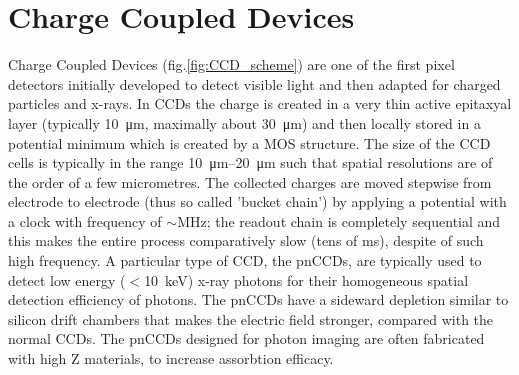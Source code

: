     
\section{Charge Coupled Devices}
   Charge Coupled Devices (fig.\ref{fig:CCD_scheme}) are one of the first pixel detectors initially developed to detect visible light and then adapted for charged particles and x-rays. 
   In CCDs the charge is created in a very thin active epitaxyal layer (typically \SI{10}{\um}, maximally about \SI{30}{\um}) and then locally stored in a potential minimum which is created by a MOS structure. 
   The size of the CCD cells is typically in the range \SIrange{10}{20}{\um} such that spatial resolutions are of the order of a few micrometres.
   The collected charges are moved stepwise from electrode to electrode (thus so called 'bucket chain') by applying a potential with a clock with frequency of $\sim$\si{MHz}; the readout chain is completely sequential and this makes the entire process comparatively slow (tens of \si{ms}), despite of such high frequency.
   A particular type of CCD, the pnCCDs, are typically used to detect low energy ($<$\SI{10}{keV}) x-ray photons for their homogeneous spatial detection efficiency of photons. The pnCCDs have a sideward depletion similar to silicon drift chambers that makes the electric field stronger, compared with the normal CCDs. 
   The pnCCDs designed for photon imaging are often fabricated with high Z materials, to increase assorbtion efficacy.



